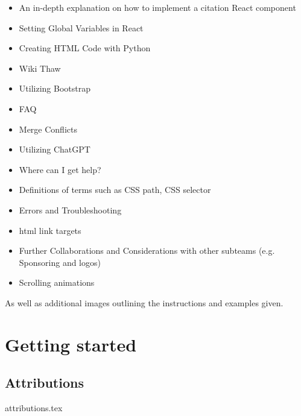 \documentclass[a4paper, 11pt, twoside]{book}
\begin{document}
\begin{itemize}
    \item An in-depth explanation on how to implement a citation React component
    \item Setting Global Variables in React
    \item Creating HTML Code with Python
    \item Wiki Thaw
    \item Utilizing Bootstrap
    \item FAQ
    \item Merge Conflicts
    \item Utilizing ChatGPT
    \item Where can I get help?
    \item Definitions of terms such as CSS path, CSS selector
    \item Errors and Troubleshooting
    \item html link targets
    \item Further Collaborations and Considerations with other subteams (e.g. Sponsoring and logos)
    \item Scrolling animations
\end{itemize}
As well as additional images outlining the instructions and examples given.
\newpage

\mainmatter
\pagecolor{pagecolor}
\chapter{Getting started} \label{sec:started}


\backmatter
\pagecolor{pagecolor}
\section*{Attributions}
{attributions.tex}
\end{document}
